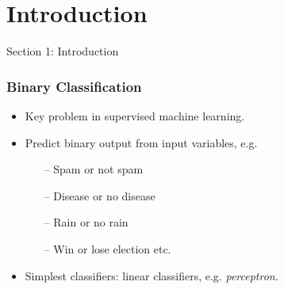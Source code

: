 \section{Introduction}

\begin{frame}
\huge{\centerline{Section 1: Introduction }}
\end{frame}
\begin{frame}
\frametitle{Binary Classification} %
\begin{itemize}
\item Key problem in supervised machine learning.



\item Predict binary output from input variables, e.g.
\begin{itemize}
\item[--] Spam or not spam
\item[--] Disease or no disease
\item[--] Rain or no rain
\item[--] Win or lose election etc.
\end{itemize}

\item Simplest classifiers: linear classifiers, e.g. \textit{perceptron}.
\end{itemize}
\end{frame}
